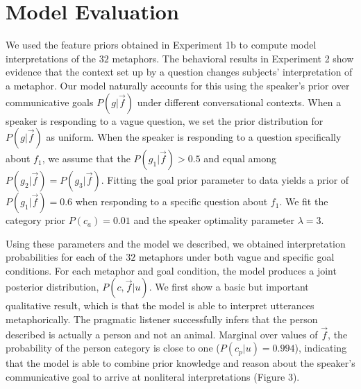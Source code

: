 \documentclass[10pt,letterpaper]{article}
\begin{document}
\section{Model Evaluation}
We used the feature priors obtained in Experiment 1b to compute model interpretations of the $32$ metaphors. The behavioral results in Experiment 2 show evidence that the context set up by a question changes subjects' interpretation of a metaphor. Our model naturally accounts for this using the speaker's prior over communicative goals $P(g | \vec f)$ under different conversational contexts. When a speaker is responding to a vague question, we set the prior distribution for $P(g | \vec f)$ as uniform. When the speaker is responding to a question specifically about $f_1$, we assume that the $P(g_1 | \vec f) > 0.5$ and equal among $P(g_2 | \vec f) = P(g_3 | \vec f)$. Fitting the goal prior parameter to data yields a prior of $P(g_1 | \vec f) = 0.6$ when responding to a specific question about $f_1$. We fit the category prior $P(c_a) = 0.01$ and the speaker optimality parameter $\lambda = 3$.

Using these parameters and the model we described, we obtained interpretation probabilities for each of the $32$ metaphors under both vague and specific goal conditions. For each metaphor and goal condition, the model produces a joint posterior distribution, $P(c, \vec f | u)$. We first show a basic but important qualitative result, which is that the model is able to interpret utterances metaphorically. The pragmatic listener successfully infers that the person described is actually a person and not an animal. Marginal over values of $\vec f$, the probability of the person category is close to one ($P(c_p | u) = 0.994$), indicating that the model is able to combine prior knowledge and reason about the speaker's communicative goal to arrive at nonliteral interpretations (Figure 3).

\end{document}
